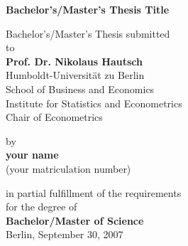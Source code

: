 \begin{center}

    {\Large{\bf Bachelor's/Master's Thesis Title}} \vspace{0.5cm}


    {\normalsize Bachelor's/Master's Thesis submitted\\\vspace{0.5cm}
    to}\\\vspace{0.5cm}
    {\normalsize{\bf Prof. Dr. Nikolaus Hautsch}} \\\vspace{0.5cm}
    {\normalsize Humboldt-Universit\"at zu Berlin \\
    School of Business and Economics \\
    Institute for Statistics and Econometrics \\
    Chair of Econometrics} \vspace{1cm}


    {\normalsize by \\\vspace{0.5cm}
    {\bf your name} \\
    (your matriculation number)} \vspace{1cm}


    {\normalsize in partial fulfillment of the requirements \\
    for the degree of \\
    {\bf Bachelor/Master of Science} \\
    Berlin, September 30, 2007}

\end{center}
